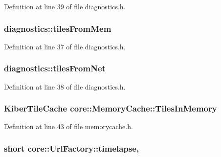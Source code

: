 Definition at line 39 of file diagnostics.\-h.

\hypertarget{group___o_p_map_widget_gade3ce38dee3744ba9c72ca0dce86b0d4}{
\subsubsection[{tiles\-From\-Mem}]{ diagnostics\-::tiles\-From\-Mem}}\label{group___o_p_map_widget_gade3ce38dee3744ba9c72ca0dce86b0d4}


Definition at line 37 of file diagnostics.\-h.

\hypertarget{group___o_p_map_widget_ga6750459fc54ae81a5870b841aff67c6c}{
\subsubsection[{tiles\-From\-Net}]{ diagnostics\-::tiles\-From\-Net}}\label{group___o_p_map_widget_ga6750459fc54ae81a5870b841aff67c6c}


Definition at line 38 of file diagnostics.\-h.

\hypertarget{group___o_p_map_widget_gaeb53ae92c08d2646f4ecbcf764e7e226}{
\subsubsection[{Tiles\-In\-Memory}]{\setlength{\rightskip}{0pt plus 5cm}Kiber\-Tile\-Cache core\-::\-Memory\-Cache\-::\-Tiles\-In\-Memory}}\label{group___o_p_map_widget_gaeb53ae92c08d2646f4ecbcf764e7e226}


Definition at line 43 of file memorycache.\-h.

\hypertarget{group___o_p_map_widget_ga5dba09925e03ae10c70290f9a2e9cc61}{
\subsubsection[{timelapse}]{\setlength{\rightskip}{0pt plus 5cm}short core\-::\-Url\-Factory\-::timelapse\hspace{0.3cm}{\ttfamily [static]}, {\ttfamily [protected]}}}\label{group___o_p_map_widget_ga5dba09925e03ae10c70290f9a2e9cc61}


